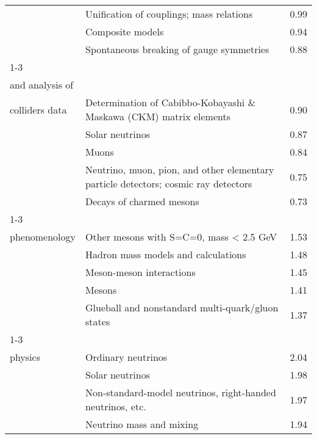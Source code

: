 \begin{longtable}[H]{p{}|p{}|p{}}
                                        & Unification of couplings; mass relations &  0.99 \\
                                        & Composite models &  0.94 \\
                                        & Spontaneous breaking of gauge symmetries &  0.88 \\
\cline{1-3}
\multirow{5}{*}{\begin{tabular}{l}Measurements\\ and analysis of\\ colliders data\end{tabular}} & Determination of Cabibbo-Kobayashi \& Maskawa (CKM) matrix elements &  0.90 \\
                                        & Solar neutrinos &  0.87 \\
                                        & Muons &  0.84 \\
                                        & Neutrino, muon, pion, and other elementary particle detectors; cosmic ray detectors &  0.75 \\
                                        & Decays of charmed mesons &  0.73 \\
\cline{1-3}
\multirow{5}{*}{\begin{tabular}{l}Meson\\ phenomenology\end{tabular}} & Other mesons with S=C=0, mass < 2.5 GeV &  1.53 \\
                                        & Hadron mass models and calculations &  1.48 \\
                                        & Meson-meson interactions &  1.45 \\
                                        & Mesons &  1.41 \\
                                        & Glueball and nonstandard multi-quark/gluon states &  1.37 \\
\cline{1-3}
\multirow{5}{*}{\begin{tabular}{l}Neutrino\\ physics\end{tabular}} & Ordinary neutrinos &  2.04 \\
                                        & Solar neutrinos &  1.98 \\
                                        & Non-standard-model neutrinos, right-handed neutrinos, etc. &  1.97 \\
                                        & Neutrino mass and mixing &  1.94 \\

\end{longtable}
